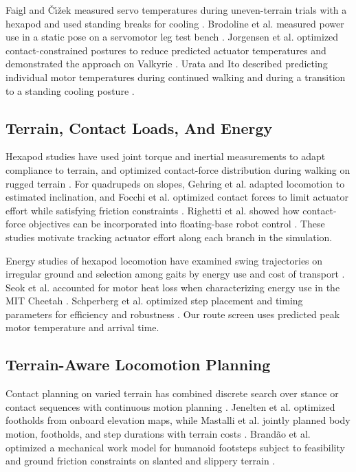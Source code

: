 \documentclass{ieeeaccess}
\begin{document}
Faigl and \v{C}\'{\i}\v{z}ek measured servo temperatures during uneven-terrain trials with a hexapod and used standing breaks for cooling \cite{faigl2019}. Brodoline et al. measured power use in a static pose on a servomotor leg test bench \cite{brodoline2024}. Jorgensen et al. optimized contact-constrained postures to reduce predicted actuator temperatures and demonstrated the approach on Valkyrie \cite{jorgensen2019}. Urata and Ito described predicting individual motor temperatures during continued walking and during a transition to a standing cooling posture \cite{urata2017}.

\subsection{Terrain, Contact Loads, And Energy}

Hexapod studies have used joint torque and inertial measurements to adapt compliance to terrain, and optimized contact-force distribution during walking on rugged terrain \cite{zhao2021,ding2024}. For quadrupeds on slopes, Gehring et al. adapted locomotion to estimated inclination, and Focchi et al. optimized contact forces to limit actuator effort while satisfying friction constraints \cite{gehring2015,focchi2017}. Righetti et al. showed how contact-force objectives can be incorporated into floating-base robot control \cite{righetti2013}. These studies motivate tracking actuator effort along each branch in the simulation.

Energy studies of hexapod locomotion have examined swing trajectories on irregular ground and selection among gaits by energy use and cost of transport \cite{luneckas2019,luneckas2021}. Seok et al. accounted for motor heat loss when characterizing energy use in the MIT Cheetah \cite{seok2015}. Schperberg et al. optimized step placement and timing parameters for efficiency and robustness \cite{schperberg2025}. Our route screen uses predicted peak motor temperature and arrival time.

\subsection{Terrain-Aware Locomotion Planning}

Contact planning on varied terrain has combined discrete search over stance or contact sequences with continuous motion planning \cite{hauser2008,valouch2021}. Jenelten et al. optimized footholds from onboard elevation maps, while Mastalli et al. jointly planned body motion, footholds, and step durations with terrain costs \cite{jenelten2020,mastalli2020}. Brandão et al. optimized a mechanical work model for humanoid footsteps subject to feasibility and ground friction constraints on slanted and slippery terrain \cite{brandao2016}.
\end{document}
